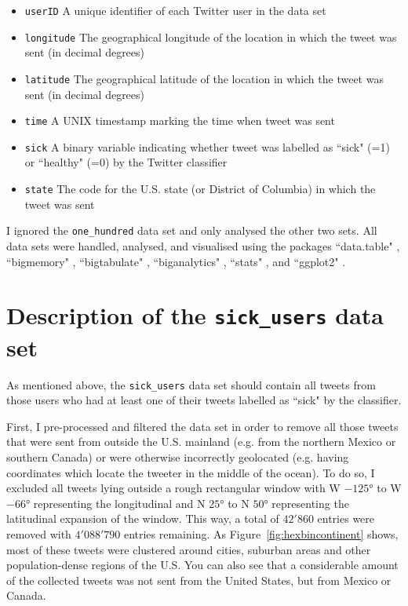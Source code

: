 \documentclass[11pt, a4paper,twoside]{report}\usepackage[]{graphicx}\usepackage[]{color}
\begin{document}
\begin{itemize}
  \item \texttt{userID} A unique identifier of each Twitter user in the data set
  \item \texttt{longitude} The geographical longitude of the location in which the tweet was sent (in decimal degrees)
  \item \texttt{latitude} The geographical latitude  of the location in which the tweet was sent (in decimal degrees)
  \item \texttt{time} A UNIX timestamp marking the time when tweet was sent
  \item \texttt{sick} A binary variable indicating whether tweet was labelled as ``sick" (=1) or ``healthy" (=0) by the Twitter classifier
  \item \texttt{state} The code for the U.S. state (or District of Columbia) in which the tweet was sent
\end{itemize}

I ignored the \texttt{one\_hundred} data set and only analysed the other two sets. All data sets were handled, analysed, and visualised using the packages ``data.table" \citep{datatable}, ``bigmemory" \citep{bigmemory}, ``bigtabulate" \citep{bigtabulate_2016}, ``biganalytics" \citep{biganalytics_2016}, ``stats" \citep{rbase_2017}, and ``ggplot2" \citep{ggplot2_2009}.

\section{Description of the \texttt{sick\_users} data set}
\label{sec:sick_user_exploratory}


As mentioned above, the \texttt{sick\_users} data set should contain all tweets from those users who had at least one of their tweets labelled as ``sick" by the classifier.

First, I pre-processed and filtered the data set in order to remove all those tweets that were sent from outside the U.S. mainland (e.g. from the northern Mexico or southern Canada) or were otherwise incorrectly geolocated (e.g. having coordinates which locate the tweeter in the middle of the ocean). To do so, I excluded all tweets lying outside a rough rectangular window with W $-125$° to W $-66$° representing the longitudinal and N $25$° to N $50$° representing the latitudinal expansion of the window. This way, a total of $42'860$ entries were removed with $4'088'790$ entries remaining. As Figure~\ref{fig:hexbincontinent} shows, most of these tweets were clustered around cities, suburban areas and other population-dense regions of the U.S. You can also see that a considerable amount of the collected tweets was not sent from the United States, but from Mexico or Canada.
\end{document}
